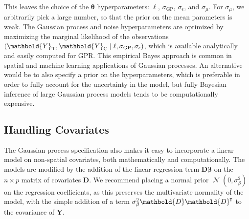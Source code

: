 \documentclass[letter,12pt]{article}
\DeclarePairedDelimiter{\parenthesis}{\lparen}{\rparen}
\newcommand{\del}[1]{\parenthesis*{#1}}
\let\Pr\relax
\DeclareMathOperator{\Pr}{\mathbb{P}}
\DeclareMathOperator{\normal}{\mathcal{N}}
\newcommand*{\trans}{^{\mkern-1.5mu\intercal}}
\newcommand{\treat}{\mathrm{T}}
\newcommand{\ctrol}{\mathrm{C}}
\newcommand{\sigmaf}{\sigma_{\mathrm{GP}}}
\newcommand{\sigman}{\sigma_{\epsilon}}
\newcommand{\sigmabeta}{\sigma_{\beta}}
\newcommand{\sigmamu}{\sigma_{\mu}}
\newcommand{\Yvec}{\mathbold{Y}}
\newcommand{\yt}{\Yvec_{\treat}}
\newcommand{\yc}{\Yvec_{\ctrol}}
\newcommand{\betavec}{\mathbold{\beta}}
\newcommand{\hyperparam}{\bm{\theta}}
\newcommand{\Dmat}{\mathbold{D}}
\begin{document}
This leaves the choice of the \(\hyperparam\) hyperparameters: \(\ell\), \(\sigmaf\), \(\sigman\), and \(\sigmamu\).
For \(\sigmamu\), we arbitrarily pick a large number, so that the prior on the mean parameters is weak.
The Gaussian process and noise hyperparameters are optimized by maximizing the marginal likelihood of the observations \(\Pr\del{\yt, \yc \mid \ell, \sigmaf, \sigman}\), which is available analytically and easily computed for GPR.
This empirical Bayes approach is common in spatial and machine learning applications of Gaussian processes.
An alternative would be to also specify a prior on the hyperparameters, which is preferable in order to fully account for the uncertainty in the model, but fully Bayesian inference of large Gaussian process models tends to be computationally expensive.



\hypertarget{handling-covariates}{%
\subsection{Handling Covariates}\label{handling-covariates}}

\label{sec:covariates}

The Gaussian process specification also makes it easy to incorporate a linear model on non-spatial covariates, both mathematically and computationally.
The models are modified by the addition of the linear regression term \(\Dmat \betavec\) on the \(n \times p\) matrix of covariates \(\Dmat\).
We recommend placing a normal prior \(\normal(0,\sigmabeta^2)\) on the regression coefficients, as this preserves the multivariate normality of the model, with the simple addition of a term \(\sigma_\beta^2 \Dmat \Dmat\trans\) to the covariance of \(\Yvec\).
\end{document}
